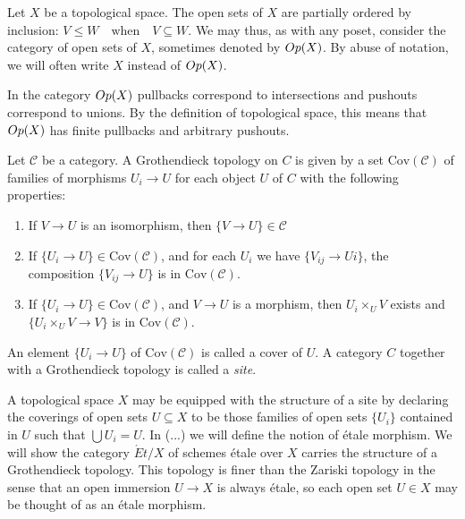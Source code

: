 
\begin{construction}\label{def:opens}
  Let $X$ be a topological space. The open sets of $X$ are partially ordered by inclusion: $V \le W \quad \text{when} \quad V \subseteq W$.  We may thus, as with any poset, consider the category of open sets of $X$, sometimes denoted by $Op(X)$. By abuse of notation, we will often write $X$ instead of $Op(X)$.
\end{construction}
\begin{remark}
 In the category $Op(X)$ pullbacks correspond to intersections and pushouts correspond to unions. By the definition of topological space, this means that $Op(X)$ has finite pullbacks and arbitrary pushouts. 
\end{remark}

\begin{definition}
	Let $\mathcal{C}$ be a category. A Grothendieck topology on $C$ is given by a set $\text{Cov}(\mathcal{C})$ of families of morphisms ${U_i \to U}$ for each object $U$ of $C$ with the following properties:
	\begin{enumerate}
		\item If $V \to U$ is an isomorphism, then $\{V \to U\} \in \mathcal{C}$
		\item If $\{U_i \to U\} \in \text{Cov}(\mathcal{C})$, and for each $U_i$ we have $\{V_{ij} \to Ui\}$, the composition $\{V_{ij} \to U\}$ is in $\text{Cov}(\mathcal{C})$.
		\item If $\{U_i \to U\} \in \text{Cov}(\mathcal{C})$, and $V \to U$ is a morphism, then $U_i \times_U V$ exists and 
		$\{U_i \times_U V \to V\}$ is in $\text{Cov}(\mathcal{C})$.
	\end{enumerate}	
	An element $\{U_i \to U\}$ of $\text{Cov}(\mathcal{C})$ is called a cover of $U$. A category $C$ together with a Grothendieck topology is called a \textit{site}.
\end{definition}

\begin{remark}
	A topological space $X$ may be equipped with the structure of a site by declaring the coverings of open sets $U \subseteq X$ to be those families of open sets $\{U_i\}$ contained in $U$ such that $\bigcup U_i = U$.  In (...) we will define the notion of \'etale morphism. We will show the category $\acute{E}t/X$ of schemes \'etale over $X$ carries the structure of a Grothendieck topology. This topology is finer than the Zariski topology in the sense that an open immersion $U \to X$ is always \'etale, so each open set $U \in X$ may be thought of as an \'etale morphism.
\end{remark}



